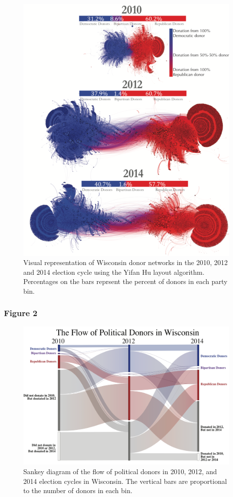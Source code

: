 \documentclass[12pt,]{article}
\begin{document}
\begin{figure}
\centering
\includegraphics{../figures/fig1.png}
\caption{Visual representation of Wisconsin donor networks in the 2010,
2012 and 2014 election cycle using the Yifan Hu layout algorithm.
Percentages on the bars reprsent the percent of donors in each party
bin.}
\end{figure}

\hypertarget{figure-2}{%
\subsubsection{Figure 2}\label{figure-2}}

\begin{figure}
\centering
\includegraphics{../figures/fig2.png}
\caption{Sankey diagram of the flow of political donors in 2010, 2012,
and 2014 election cycles in Wisconsin. The vertical bars are
proportional to the number of donors in each bin.}
\end{figure}
\end{document}
